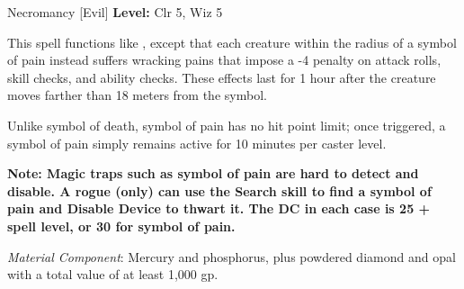 {Necromancy [Evil]}
{
	\textbf{Level:}
	Clr 5, Wiz 5\\
}
{
	This spell functions like , except that each creature within the radius of a symbol of pain instead suffers wracking pains that impose a -4 penalty on attack rolls, skill checks, and ability checks. These effects last for 1 hour after the creature moves farther than 18 meters from the symbol.

	Unlike symbol of death, symbol of pain has no hit point limit; once triggered, a symbol of pain simply remains active for 10 minutes per caster level.

	\textbf{Note: Magic traps such as symbol of pain are hard to detect and disable. A rogue (only) can use the Search skill to find a symbol of pain and Disable Device to thwart it. The DC in each case is 25 + spell level, or 30 for symbol of pain.}

	\textit{Material Component}:
	Mercury and phosphorus, plus powdered diamond and opal with a total value of at least 1,000 gp.

}
